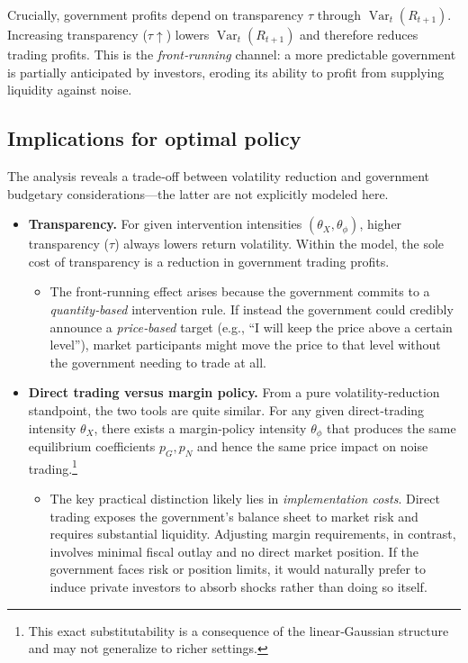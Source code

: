 \documentclass[12pt]{article}
\begin{document}
Crucially, government profits depend on transparency \(\tau\) through \(\operatorname{Var}_t(R_{t+1})\).  
Increasing transparency (\(\tau \uparrow\)) lowers \(\operatorname{Var}_t(R_{t+1})\) and therefore reduces trading profits.  
This is the \emph{front‑running} channel: a more predictable government is partially anticipated by investors, eroding its ability to profit from supplying liquidity against noise.


\subsection{Implications for optimal policy}

The analysis reveals a trade‑off between volatility reduction and government budgetary considerations—the latter are not explicitly modeled here.

\begin{itemize}
    \item \textbf{Transparency.}  
    For given intervention intensities \((\theta_X,\theta_\phi)\), higher transparency (\(\tau\)) always lowers return volatility.  
    Within the model, the sole cost of transparency is a reduction in government trading profits.  

    \begin{itemize}
        \item The front‑running effect arises because the government commits to a \emph{quantity‑based} intervention rule. If instead the government could credibly announce a \emph{price‑based} target (e.g., ``I will keep the price above a certain level''), market participants might move the price to that level without the government needing to trade at all.
    \end{itemize}

    \item \textbf{Direct trading versus margin policy.}  
    From a pure volatility‑reduction standpoint, the two tools are quite similar.  
    For any given direct‑trading intensity \(\theta_X\), there exists a margin‑policy intensity \(\theta_\phi\) that produces the same equilibrium coefficients \(p_G, p_N\) and hence the same price impact on noise trading.\footnote{This exact substitutability is a consequence of the linear‑Gaussian structure and may not generalize to richer settings.}

    \begin{itemize}
        \item The key practical distinction likely lies in \emph{implementation costs}.  
    Direct trading exposes the government’s balance sheet to market risk and requires substantial liquidity.  
    Adjusting margin requirements, in contrast, involves minimal fiscal outlay and no direct market position.  
    If the government faces risk or position limits, it would naturally prefer to induce private investors to absorb shocks rather than doing so itself.
    \end{itemize}
\end{itemize}
\end{document}
